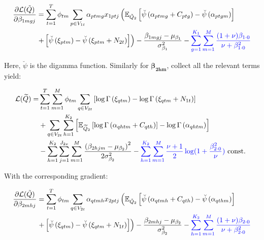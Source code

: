 \documentclass{article}
\begin{document}
\begin{equation*}
\begin{aligned} 
\frac{\partial \mathcal{L}(\tilde{Q})}{\partial \beta_{1 m g j}} &=\sum_{t=1}^{T} \phi_{t m} \sum_{p \in V_{1t}} \alpha_{p t m g} x_{1 p t j}\left(\mathbb{E}_{\tilde{Q}_{2}}\left[\breve{\psi}\left(\alpha_{p t m g}+C_{p t g}\right)-\breve{\psi}\left(\alpha_{p t g m }\right)\right]\right.\\ 
&\left.+\left[\breve{\psi}\left(\xi_{p t m}\right)-\breve{\psi}\left(\xi_{p t m}+N_{2t}\right)\right]\right) -\frac{\beta_{1 m g j}-\mu_{\beta_{1}}}{\sigma_{\beta_{1}}^{2}} -\textcolor{blue}{\sum_{g=1}^{K_{1}} \sum_{m=1}^M \frac{(1+\nu)\beta_{1\cdot 0}}{\nu + \beta_{1\cdot 0}^2}}
\end{aligned}
\end{equation*}

Here, $\breve{\psi}$ is the digamma function. Similarly for $\boldsymbol{\beta_{2hm}}$, collect all the relevant terms yield:

\begin{equation*}
\begin{aligned} \mathcal{L}(\widetilde{Q})=& \sum_{t=1}^T \sum_{m=1}^M \phi_{tm}\sum_{q \in V_{2t}}\left[\log \Gamma\left(\xi_{q t m}\right)-\log \Gamma\left(\xi_{qtm}+N_{1t}\right)\right] \\ 
&+\sum_{q \in V_{2t}} \sum_{h=1}^{K_{2}}\left[\mathbb{E}_{\widetilde{Q}_{2}}\left[\log \Gamma\left(\alpha_{q h t m}+C_{q t h}\right)\right]-\log \Gamma\left(\alpha_{q h t m}\right)\right] \\ 
&-\sum_{h=1}^{K_{2}} \sum_{j=1}^{J_{2 x}} \sum_{m=1}^M \frac{\left(\beta_{2 h j m}-\mu_{\beta_{2}}\right)^{2}}{2 \sigma_{\beta_{2}}^{2}}- \textcolor{blue}{ \sum_{h=1}^{K_{2}} \sum_{m=1}^M \frac{\nu + 1}{2} \log(1 + \frac{\beta_{2\cdot 0}^2}{\nu})} \text { const. } \end{aligned}
\end{equation*}

With the corresponding gradient:

\begin{equation*}
\begin{aligned} 
\frac{\partial \mathcal{L}(\tilde{Q})}{\partial \beta_{2 m h j}} &=\sum_{t=1}^{T} \phi_{t m} \sum_{q \in V_{2t}} \alpha_{q t m h} x_{2 p t j} \left(\mathbb{E}_{\tilde{Q}_{2}}\left[\breve{\psi}\left(\alpha_{q t m h}+C_{q t h}\right)-\breve{\psi}\left(\alpha_{q t h m }\right)\right]\right.\\ 
&\left.+\left[\breve{\psi}\left(\xi_{q t m}\right)-\breve{\psi}\left(\xi_{q t m}+N_{1t}\right)\right]\right) -\frac{\beta_{2 m h j}-\mu_{\beta_{2}}}{\sigma_{\beta_{2}}^{2}} - \textcolor{blue}{ \sum_{h=1}^{K_{2}} \sum_{m=1}^M \frac{(1+\nu)\beta_{2\cdot 0}}{\nu + \beta_{2\cdot 0}^2}}
\end{aligned}
\end{equation*}
\end{document}
